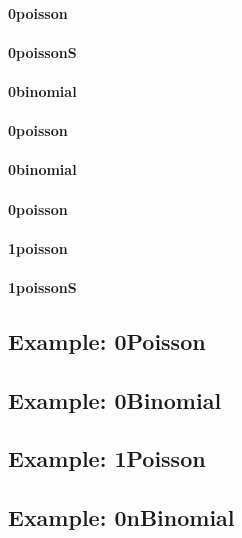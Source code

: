 \documentclass[a4paper,11pt]{article}
\begin{document}
\paragraph{0poisson}
{\small }
\clearpage
\paragraph{0poissonS}
{\small }
\clearpage
\paragraph{0binomial}
{\small }
\clearpage
\paragraph{0poisson}
{\small }
\clearpage
\paragraph{0binomial}
{\small }
\clearpage
\paragraph{0poisson}
{\small }
\clearpage
\paragraph{1poisson}
{\small }
\clearpage
\paragraph{1poissonS}
{\small }


\clearpage
\subsection*{Example: 0Poisson}
{\small }

\clearpage
\subsection*{Example: 0Binomial}
{\small }

\clearpage
\subsection*{Example: 1Poisson}
{\small }

\clearpage
\subsection*{Example: 0nBinomial}
{\small }
\end{document}
